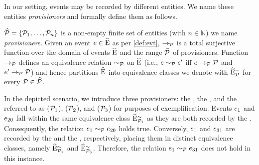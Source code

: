 \begin{newj}
In our setting, events may be recorded by different entities. We name these entities \emph{provisioners} and formally define them as follows.
\begin{definition}[Provisioner]\label{def:provisioner}
	$\widehat{\mathcal{P}} = \{ \mathcal{P}_1, \ldots, \mathcal{P}_n \}$ is a non-empty finite set of entities (with $n \in \mathbb{N}$) we name \emph{provisioner}s. 
	Given an event $e \in \widehat{\mathrm{E}}$ as per \cref{def:evt}, $\to_{\mathcal{P}}$ is a total surjective function over the domain of events $\widehat{\mathrm{E}}$ and the range $\widehat{\mathcal{P}}$ of provisioners. Function $\to_{\mathcal{P}}$ defines an equivalence relation $\sim_{\mathcal{P}}$ on $\widehat{\mathrm{E}}$ (i.e., $e \sim_{\mathcal{P}} e'$ iff $e \to_{\mathcal{P}} \mathcal{P}$ and $e' \to_{\mathcal{P}} \mathcal{P}$) and hence partitions $\widehat{\mathrm{E}}$ into equivalence classes we denote with $\widehat{\mathrm{E}}^{\sim}_{\mathcal{P}}$ for every $\mathcal{P} \in \widehat{\mathcal{P}}$.
\end{definition}
In the depicted scenario, we introduce three provisioners: the , the , and the   referred to as ($\mathcal{P}_1$), ($\mathcal{P}_2$), and ($\mathcal{P}_3$) for purposes of exemplification. Events $e_{1}$ and $e_{20}$ fall within the same equivalence class $\widehat{\mathrm{E}}^{\sim}_{\mathcal{P}_1}$ as they are both recorded by the . Consequently, the relation $e_1 \sim_{\mathcal{P}} e_{20}$ holds true. Conversely, $e_{1}$ and $e_{31}$ are recorded by the  and the , respectively, placing them in distinct equivalence classes, namely $\widehat{\mathrm{E}}^{\sim}_{\mathcal{P}_1}$ and $\widehat{\mathrm{E}}^{\sim}_{\mathcal{P}_3}$. Therefore, the relation $e_1 \sim_{\mathcal{P}} e_{31}$ does not hold in this instance. 


\end{newj}
